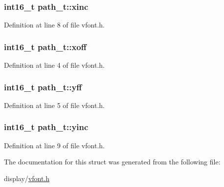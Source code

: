 \subsubsection[{\texorpdfstring{xinc}{xinc}}]{\setlength{\rightskip}{0pt plus 5cm}int16\+\_\+t path\+\_\+t\+::xinc}\hypertarget{structpath__t_a88d6e591604a22ee9bd48f014fc6585c}{}\label{structpath__t_a88d6e591604a22ee9bd48f014fc6585c}


Definition at line 8 of file vfont.\+h.

\subsubsection[{\texorpdfstring{xoff}{xoff}}]{\setlength{\rightskip}{0pt plus 5cm}int16\+\_\+t path\+\_\+t\+::xoff}\hypertarget{structpath__t_afe950c04d6d3082639bd97b53f0f4b41}{}\label{structpath__t_afe950c04d6d3082639bd97b53f0f4b41}


Definition at line 4 of file vfont.\+h.

\subsubsection[{\texorpdfstring{yff}{yff}}]{\setlength{\rightskip}{0pt plus 5cm}int16\+\_\+t path\+\_\+t\+::yff}\hypertarget{structpath__t_a208b1e1aa60b621e3632cc28d0b4f14b}{}\label{structpath__t_a208b1e1aa60b621e3632cc28d0b4f14b}


Definition at line 5 of file vfont.\+h.

\subsubsection[{\texorpdfstring{yinc}{yinc}}]{\setlength{\rightskip}{0pt plus 5cm}int16\+\_\+t path\+\_\+t\+::yinc}\hypertarget{structpath__t_a224367f52f511bef405c7579240f55d1}{}\label{structpath__t_a224367f52f511bef405c7579240f55d1}


Definition at line 9 of file vfont.\+h.



The documentation for this struct was generated from the following file\+:\begin{DoxyCompactItemize}
\item 
display/\hyperlink{vfont_8h}{vfont.\+h}\end{DoxyCompactItemize}
